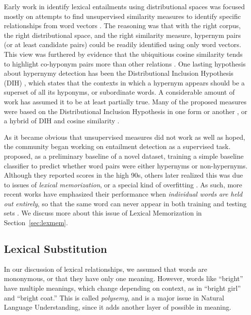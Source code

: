 \documentclass[12pt]{article}
\begin{document}
Early work in identify lexical entailments using distributional spaces was
focused mostly on attempts to find unsupervised similarity measures to identify
specific relationships from word vectors
\cite{weeds:2004:coling,clarke:2009:gems,kotlerman:2010:nle,lenci:2012:starsem,santus:2013:thesis}.
The reasoning was that with the right corpus, the right
distributional space, and the right similarity measure, hypernym pairs
(or at least candidate pairs) could be readily identified using only word
vectors. This view was furthered by evidence that the ubiquitious
cosine similarity tends to highlight co-hyponym pairs more than other relations
\cite{weeds:2004:coling,baroni:2011:gems}.  One lasting hypothesis about
hypernymy detection has been the Distributional Inclusion Hypothesis (DIH)
\cite{zhitomirsky-geffet:2005:acl}, which states that the contexts in which a
hypernym appears should be a superset of all its hyponyms, or subordinate
words. A considerable
amount of work has assumed it to be at least partially true.  Many of the
proposed measures were based on the Distributional Inclusion Hypothesis in one
form or another \cite{clarke:2009:gems}, or a hybrid of DIH and cosine
similarity \cite{kotlerman:2010:nle,lenci:2012:starsem}.

As it became obvious that unsupervised measures did not work as
well as hoped, the community began working on entailment detection as a
supervised task.  proposed, as a preliminary baseline
of a novel dataset, training a simple baseline classifier to predict whether
word pairs were either hypernyms or non-hypernyms. Although they reported scores
in the high 90s, others later realized this was due to issues of {\em lexical
memorization}, or a special kind of overfitting
\cite{roller:2014:coling,weeds:2014:coling,levy:2015:naacl}. As such, more
recent works have emphasized their performance when {\em individual words are
held out entirely}, so that the same word can never appear in both training and
testing sets
\cite{roller:2014:coling,kruszewski:2015:tacl,levy:2015:naacl,shwartz:2016:acl,roller:2016:naacl}.
We discuss more about this issue of Lexical Memorization in
Section~\ref{sec:lexmem}.

\subsection{Lexical Substitution}
\label{sec:lexsub}

In our discussion of lexical relationships, we assumed that words are
mononymous, or that they have only one meaning. However, words like ``bright''
have multiple meanings, which change depending on context, as in ``bright
girl'' and ``bright coat.'' This is called {\em polysemy}, and is a major issue
in Natural Language Understanding, since it adds another layer of possible in
meaning.
\end{document}
